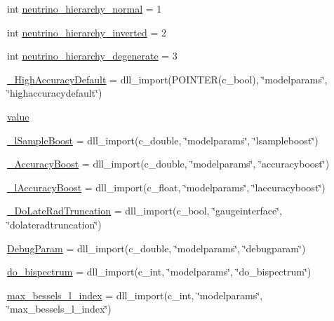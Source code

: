 \begin{DoxyCompactItemize}
int \mbox{\hyperlink{namespacecamb_1_1model_adc0a95ca34a39acf53f56e4d65a7ccf6}{neutrino\+\_\+hierarchy\+\_\+normal}} = 1
\item 
int \mbox{\hyperlink{namespacecamb_1_1model_a6754f90df944d89b894f556f07691aad}{neutrino\+\_\+hierarchy\+\_\+inverted}} = 2
\item 
int \mbox{\hyperlink{namespacecamb_1_1model_a7d0c742df55315fe00e79bfb2140e44e}{neutrino\+\_\+hierarchy\+\_\+degenerate}} = 3
\item 
\mbox{\hyperlink{namespacecamb_1_1model_ade14724046c4f97d8882e47f8034243c}{\+\_\+\+High\+Accuracy\+Default}} = dll\+\_\+import(P\+O\+I\+N\+T\+ER(c\+\_\+bool), \char`\"{}modelparams\char`\"{}, \char`\"{}highaccuracydefault\char`\"{})
\item 
\mbox{\hyperlink{namespacecamb_1_1model_a1ae11d40fae5c7def98c00219dc6ed3e}{value}}
\item 
\mbox{\hyperlink{namespacecamb_1_1model_a7d8e7de62dd1ffbbbf48bc7f8d991bdf}{\+\_\+l\+Sample\+Boost}} = dll\+\_\+import(c\+\_\+double, \char`\"{}modelparams\char`\"{}, \char`\"{}lsampleboost\char`\"{})
\item 
\mbox{\hyperlink{namespacecamb_1_1model_ab55a000a5f92497eb7b15ced6029ff81}{\+\_\+\+Accuracy\+Boost}} = dll\+\_\+import(c\+\_\+double, \char`\"{}modelparams\char`\"{}, \char`\"{}accuracyboost\char`\"{})
\item 
\mbox{\hyperlink{namespacecamb_1_1model_a62011da9b7a3ed29a9c29d0568fa7794}{\+\_\+l\+Accuracy\+Boost}} = dll\+\_\+import(c\+\_\+float, \char`\"{}modelparams\char`\"{}, \char`\"{}laccuracyboost\char`\"{})
\item 
\mbox{\hyperlink{namespacecamb_1_1model_acb6dc8e373f901e8089b950041fecfa7}{\+\_\+\+Do\+Late\+Rad\+Truncation}} = dll\+\_\+import(c\+\_\+bool, \char`\"{}gaugeinterface\char`\"{}, \char`\"{}dolateradtruncation\char`\"{})
\item 
\mbox{\hyperlink{namespacecamb_1_1model_a6eafa5f0e3403059f0e189ec00af87e2}{Debug\+Param}} = dll\+\_\+import(c\+\_\+double, \char`\"{}modelparams\char`\"{}, \char`\"{}debugparam\char`\"{})
\item 
\mbox{\hyperlink{namespacecamb_1_1model_aabe9302a4b4ff9ae24ec7f62e659a0b5}{do\+\_\+bispectrum}} = dll\+\_\+import(c\+\_\+int, \char`\"{}modelparams\char`\"{}, \char`\"{}do\+\_\+bispectrum\char`\"{})
\item 
\mbox{\hyperlink{namespacecamb_1_1model_a0ddad5a082b061f5b3c5795a58def374}{max\+\_\+bessels\+\_\+l\+\_\+index}} = dll\+\_\+import(c\+\_\+int, \char`\"{}modelparams\char`\"{}, \char`\"{}max\+\_\+bessels\+\_\+l\+\_\+index\char`\"{})

\end{DoxyCompactItemize}
